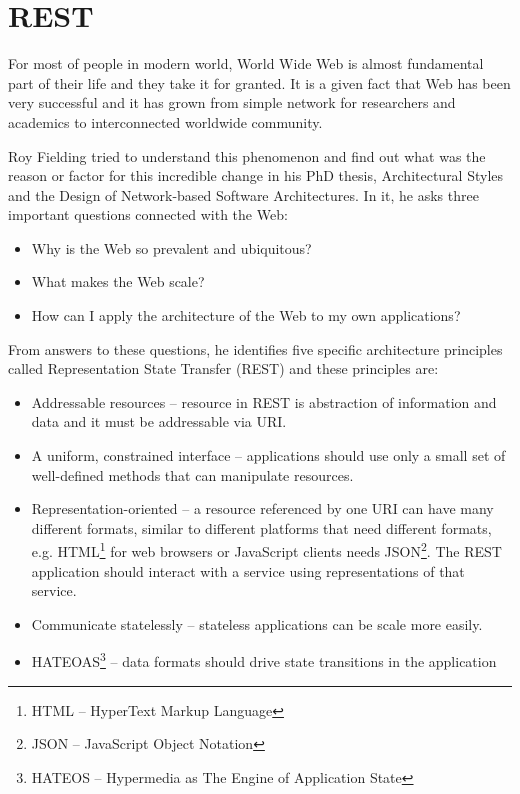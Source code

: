 \documentclass[12pt,final,oneside]{fithesis2}
\begin{document}
\section{REST}
For most of people in modern world, World Wide Web is almost fundamental part of their life and they take it for granted. It is a given fact that Web has been very successful and it has grown from simple network for researchers and academics to interconnected worldwide community. 

Roy Fielding tried to understand this phenomenon and find out what was the reason or factor for this incredible change in his PhD thesis, Architectural Styles and the Design of Network-based Software Architectures\cite{rest-arch}. In it, he asks three important questions connected with the Web:
\begin{itemize}
\item
Why is the Web so prevalent and ubiquitous?

\item 
What makes the Web scale?

\item
How can I apply the architecture of the Web to my own applications?
\end{itemize}

From answers to these questions, he identifies five specific architecture principles called Representation State Transfer (REST) and these principles are:

\begin{itemize}
\item
Addressable resources -- resource in REST is abstraction of information and data and it must be addressable via URI.

\item
A uniform, constrained interface -- applications should use only a small set of well-defined methods that can manipulate resources.

\item
Representation-oriented -- a resource referenced by one URI can have many different formats, similar to different platforms that need different formats, e.g. HTML\footnote{HTML -- HyperText Markup Language} for web browsers or JavaScript clients needs JSON\footnote{JSON -- JavaScript Object Notation}. The REST application should interact with a service using representations of that service. 

\item
Communicate statelessly -- stateless applications can be scale more easily.

\item
HATEOAS\footnote{HATEOS -- Hypermedia as The Engine of Application State} -- data formats should drive state transitions in the application

\end{itemize}
\end{document}
